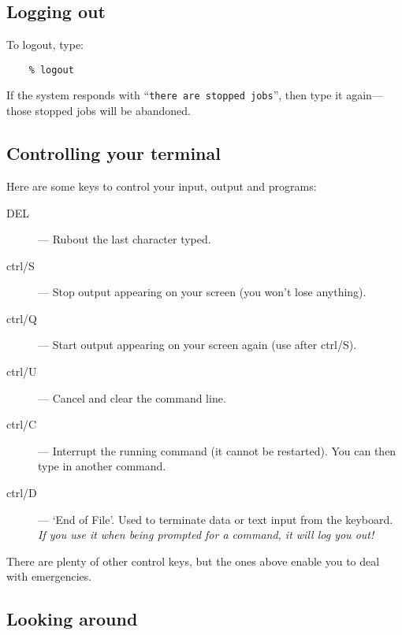 \subsection{Logging out}

To logout, type:
\begin{verbatim}
    % logout
\end{verbatim}
If the system responds with ``{\tt there  are stopped jobs}'', then type it
again---those stopped jobs will be abandoned.

\subsection{Controlling your terminal}

Here are some keys to control your input, output and programs:
\begin{description}
\begin{description}
\item [DEL] --- Rubout the last character typed.
\item [ctrl/S] --- Stop output appearing on your screen (you won't lose
  anything).
\item [ctrl/Q] --- Start output appearing on your screen again (use after
  ctrl/S).
\item [ctrl/U] --- Cancel and clear the command line.
\item [ctrl/C] --- Interrupt the running command (it cannot be restarted).
  You can then type in another command.
\item [ctrl/D] --- `End of File'. Used to terminate data or text input from
  the keyboard.  {\em If you use it when being prompted for a command, it will
  log you out!}
\end{description}
\end{description}
There are plenty of other control keys, but the ones above enable you to deal
with emergencies.

\subsection{Looking around}

